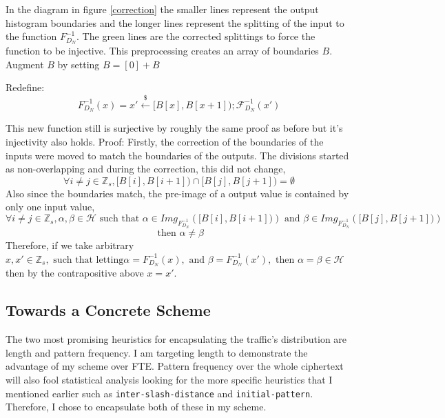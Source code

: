 \documentclass[ %
                    author={Samuel Russell},
                supervisor={Prof. Bogdan Warinschi},
                    degree={MEng},
                     title={Innocuous Ciphertexts},
                  subtitle={The DE-CENSOR Scheme},
                      type={research},
                      year={2018} ]{dissertation}
\begin{document}
In the diagram in figure \ref{correction} the smaller lines represent the output histogram boundaries and the longer lines represent the splitting of the input to the function $F^{-1}_{D_N}$.
The green lines are the corrected splittings to force the function to be injective. This preprocessing creates an array of boundaries $B$. Augment $B$ by setting $B = [0] + B$

Redefine:
$$F^{-1}_{D_N}(x) = x' \xleftarrow{\$} [B[x], B[x+1]); \mathcal{F}^{-1}_{D_N}(x')$$

This new function still is surjective by roughly the same proof as before but it's injectivity also holds.
Proof:
Firstly, the correction of the boundaries of the inputs were moved to match the boundaries of the outputs.
The divisions started as non-overlapping and during the correction, this did not change, 
$$\forall i \neq j \in \mathbb{Z}_s, \big[ B[i],B[i+1] \big) \cap \big[ B[j],B[j+1] \big) = \emptyset$$
Also since the boundaries match, the pre-image of a output value is contained by only one input value,
$$ \forall i \neq j \in \mathbb{Z}_s, \alpha,\beta \in \mathcal{H} \text{ such that } \alpha \in Img_{F^{-1}_{D_N}}(\big[ B[i],B[i+1] \big)) \text{ and } \beta \in Img_{F^{-1}_{D_N}}(\big[ B[j],B[j+1] \big))$$
$$\text{ then } \alpha \neq \beta$$
Therefore, if we take arbitrary $x, x' \in \mathbb{Z}_s, \text{ such that letting} \alpha = F^{-1}_{D_N}(x), \text{ and } \beta = F^{-1}_{D_N}(x'), \text{ then } \alpha = \beta \in \mathcal{H}$ then by the contrapositive above $x=x'$.

\subsection{Towards a Concrete Scheme}

The two most promising heuristics for encapsulating the traffic's distribution are length and pattern frequency.
I am targeting length to demonstrate the advantage of my scheme over FTE. Pattern frequency over the whole ciphertext will also fool statistical analysis looking for the more specific heuristics that I mentioned earlier such as \texttt{inter-slash-distance} and \texttt{initial-pattern}.
Therefore, I chose to encapsulate both of these in my scheme. 
\end{document}
